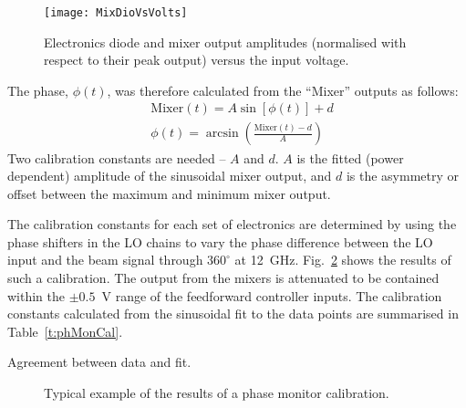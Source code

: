 \begin{figure}
 \centering
  \texttt{[image: MixDioVsVolts]}
  \caption{\label{f:MixDioVsVolts}Electronics diode and mixer output 
  amplitudes (normalised with respect to their peak output) versus the input 
  voltage.}
\end{figure}

The phase, \(\phi(t)\), was therefore calculated from the ``Mixer'' outputs as 
follows:
\begin{align}
  &\mathrm{Mixer}(t) = A\sin[\phi(t)] + d \\
  &\phi(t) = \arcsin\left(\frac{\mathrm{Mixer}(t)-d}{A}\right)
  \label{e:phaseRecUsed}
\end{align}
Two calibration constants are needed -- \(A\) and \(d\). \(A\) is the fitted 
(power dependent) 
amplitude of the sinusoidal mixer output, and \(d\) is the asymmetry or offset 
between the maximum and minimum mixer output.

The calibration constants for each set of electronics are determined by using 
the phase shifters in the LO chains to vary the phase difference between the LO 
input and the beam signal through \(360^\circ\) at 12~GHz. 
Fig.~\ref{f:phMonCal} shows the results of such a calibration. The output from 
the mixers is attenuated to be contained within the \(\pm 
0.5\)~V range of the feedforward controller inputs. The calibration constants 
calculated from the sinusoidal fit to the data points are summarised in 
Table~\ref{t:phMonCal}.

Agreement between data and fit.
 
\begin{figure}
  
  \hfill
  \captionsetup{width=.45\linewidth}%
   
 \centering
 \captionsetup{width=.65\linewidth}%
  \caption{\label{f:phMonCal}Typical example of the results of a phase   monitor calibration.}
\end{figure}

